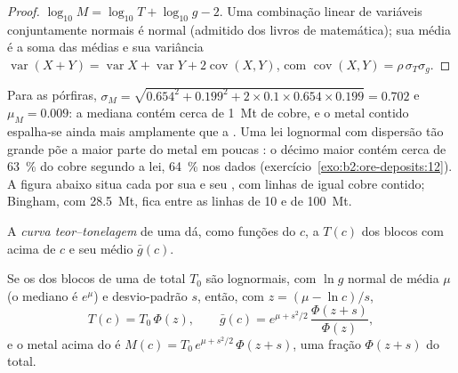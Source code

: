 \begin{proof}
$\log_{10} M = \log_{10} T + \log_{10} g - 2$. Uma combinação linear de variáveis conjuntamente normais é
normal (admitido dos livros de matemática); sua média é a soma das médias e sua variância
$\operatorname{var}(X + Y) = \operatorname{var} X + \operatorname{var} Y + 2\operatorname{cov}(X, Y)$,
com $\operatorname{cov}(X, Y) = \rho\,\sigma_T\sigma_g$.
\end{proof}

Para as  pórfiras, $\sigma_M = \sqrt{0.654^2 + 0.199^2 + 2 \times 0.1 \times 0.654 \times
0.199} = 0.702$ e $\mu_M = 0.009$: a  mediana contém cerca de \qty{1}{Mt} de cobre, e o
metal contido espalha-se ainda mais amplamente que a . Uma lei lognormal com dispersão tão grande
põe a maior parte do metal em poucas : o décimo maior contém cerca de \qty{63}{\percent} do
cobre segundo a lei, \qty{64}{\percent} nos dados (exercício~\ref{exo:b2:ore-deposits:12}). A
figura abaixo situa cada  por sua  e seu , com linhas de igual cobre contido;
Bingham, com \qty{28.5}{Mt}, fica entre as linhas de 10 e de \qty{100}{Mt}.

\begin{definition}\label{def:b2:ore-deposits:gt}
A \emph{curva teor--tonelagem} de uma  dá, como funções do
 $c$, a  $T(c)$ dos blocos com  acima de $c$ e seu  médio
$\bar g(c)$.
\end{definition}

\begin{proposition}\label{prop:b2:ore-deposits:gt}
Se os  dos blocos de uma  de  total $T_0$ são lognormais, com $\ln g$ normal
de média $\mu$ (o  mediano é $e^{\mu}$) e desvio-padrão $s$, então, com $z = (\mu -
\ln c)/s$,
\begin{equation}
T(c) = T_0\,\Phi(z), \qquad
\bar g(c) = e^{\mu + s^2/2}\,\frac{\Phi(z + s)}{\Phi(z)} ,
\label{eq:b2:ore-deposits:gt}
\end{equation}
e o metal acima do  é $M(c) = T_0\,e^{\mu + s^2/2}\,\Phi(z + s)$, uma fração $\Phi(z +
s)$ do total.
\end{proposition}

